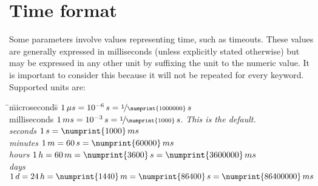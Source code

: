 
\pagebreak[4]
\section{Time format}\label{Time formats}

Some parameters involve values representing time, such as timeouts. These
values are generally expressed in milliseconds (unless explicitly stated
otherwise) but may be expressed in any other unit by suffixing the unit to the
numeric value. It is important to consider this because it will not be repeated
for every keyword. Supported units are:

\begin{tabbing}
\qquad\=\quad\= microseconds\quad\= $1\,\mu s = 10^{-6}\,s = \nicefrac{1}{\numprint{1000000}}\,s$\\
\> \> milliseconds\> $1\,ms = 10^{-3}\,s = \nicefrac{1}{\numprint{1000}}\,s$. \em{This is the default.}\\
\>  \> seconds\>  $1\,s = \numprint{1000}\,ms$\\
\>  \> minutes\>  $1\,m = 60\,s = \numprint{60000}\,ms$\\
\>  \> hours\>    $1\,h = 60\,m = \numprint{3600}\,s = \numprint{3600000}\,ms$\\
\>  \> days\>     $1\,d = 24\,h = \numprint{1440}\,m = \numprint{86400}\,s = \numprint{86400000}\,ms$\\
\end{tabbing}

